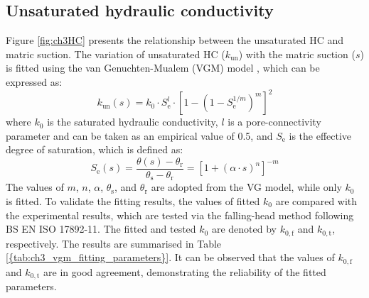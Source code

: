 \subsection{Unsaturated hydraulic conductivity}
Figure \ref{fig:ch3HC} presents the relationship between the unsaturated \ac{HC} and matric suction. The variation of unsaturated \ac{HC} ($k_\mathrm{un}$) with the matric suction ($s$) is fitted using the van Genuchten-Mualem (VGM) model \parencite{mualemNewModelPredicting1976, vangenuchtenClosedformEquationPredicting1980}, which can be expressed as:
\begin{equation}
    k_\mathrm{un}(s) = k_0 \cdot S_\mathrm{e}^{l} \cdot [1 - (1 - S_\mathrm{e}^{1/m})^m]^2
\end{equation}
where $k_0$ is the saturated hydraulic conductivity, $l$ is a pore-connectivity parameter and can be taken as an empirical value of 0.5, and $S_\mathrm{e}$ is the effective degree of saturation, which is defined as:
\begin{equation}
    S_\mathrm{e}(s) = \frac{\theta(s) - \theta_\mathrm{r}}{\theta_\mathrm{s} - \theta_\mathrm{r}} = [1 + (\alpha \cdot s)^n]^{-m}
\end{equation}
The values of $m$, $n$, $\alpha$, $\theta_\mathrm{s}$, and $\theta_\mathrm{r}$ are adopted from the VG model, while only $k_0$ is fitted. To validate the fitting results, the values of fitted $k_0$ are compared with the experimental results, which are tested via the falling-head method following BS EN ISO 17892-11. The fitted and tested $k_0$ are denoted by $k_{0,\mathrm{f}}$ and $k_{0,\mathrm{t}}$, respectively. The results are summarised in Table \ref{{tab:ch3_vgm_fitting_parameters}}. It can be observed that the values of $k_{0,\mathrm{f}}$ and $k_{0,\mathrm{t}}$ are in good agreement, demonstrating the reliability of the fitted parameters.\par
